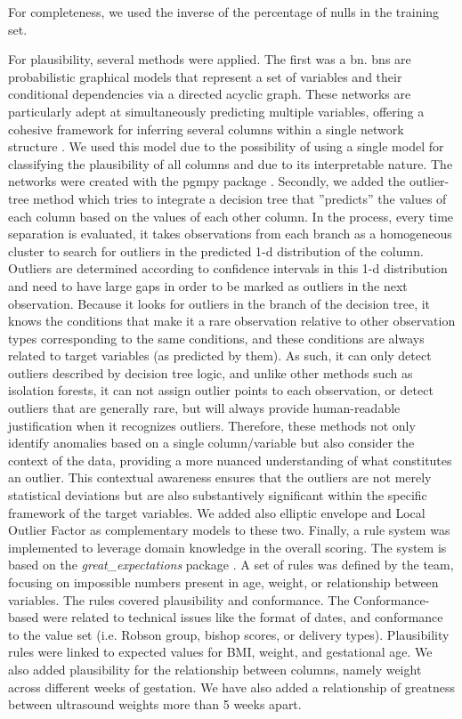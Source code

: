 For completeness, we used the inverse of the percentage of nulls in the training set. 

For plausibility, several methods were applied. The first was a \ac{bn}. \acp{bn} are probabilistic graphical models that represent a set of variables and their conditional dependencies via a directed acyclic graph. These networks are particularly adept at simultaneously predicting multiple variables, offering a cohesive framework for inferring several columns within a single network structure \cite{pearl1988probabilistic}.
We used this model due to the possibility of using a single model for classifying the plausibility of all columns and due to its interpretable nature. The networks were created with the pgmpy package \cite{pgmpy}. Secondly, we added the outlier-tree method \cite{cortesExplainableOutlierDetection2020} which tries to integrate a decision tree that ”predicts” the values of each column based on the values of each other column. In the process, every time separation is evaluated, it takes observations from each branch as a homogeneous cluster to search for outliers in the predicted 1-d distribution of the column. Outliers are determined according to confidence intervals in this 1-d distribution and need to have large gaps in order to be marked as outliers in the next observation. Because it looks for outliers in the branch of the decision tree, it knows the conditions that make it a rare observation relative to other observation types corresponding to the same conditions, and these conditions are always related to target variables (as predicted by them). As such, it can only detect outliers described by decision tree logic, and unlike other methods such as isolation forests, it can not assign outlier points to each observation, or detect outliers that are generally rare, but will always provide human-readable justification when it recognizes outliers. Therefore, these methods not only identify anomalies based on a single column/variable but also consider the context of the data, providing a more nuanced understanding of what constitutes an outlier. This contextual awareness ensures that the outliers are not merely statistical deviations but are also substantively significant within the specific framework of the target variables. We added also elliptic envelope and Local Outlier Factor as complementary models to these two. Finally, a rule system was implemented to leverage domain knowledge in the overall scoring. The system is based on the \textit{great\_expectations} package \cite{GXProactiveCollaborative}. A set of rules was defined by the team, focusing on impossible numbers present in age, weight, or relationship between variables. The rules covered plausibility and conformance. The Conformance-based were related to technical issues like the format of dates, and conformance to the value set (i.e. Robson group, bishop scores, or delivery types). Plausibility rules were linked to expected values for BMI, weight, and gestational age. We also added plausibility for the relationship between columns, namely weight across different weeks of gestation. We have also added a relationship of greatness between ultrasound weights more than 5 weeks apart. 

